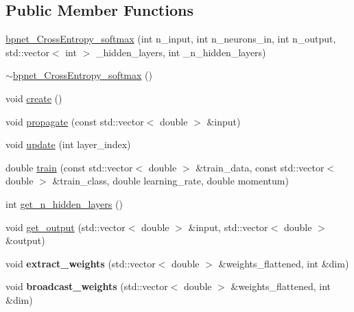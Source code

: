 \subsection*{Public Member Functions}
\begin{DoxyCompactItemize}
\item 
\hyperlink{classbpnet__CrossEntropy__softmax_af27dfc3aa73d018c4c5d9f27ae7057f1}{bpnet\-\_\-\-Cross\-Entropy\-\_\-softmax} (int n\-\_\-input, int n\-\_\-neurons\-\_\-in, int n\-\_\-output, std\-::vector$<$ int $>$ \-\_\-hidden\-\_\-layers, int \-\_\-n\-\_\-hidden\-\_\-layers)
\item 
\hyperlink{classbpnet__CrossEntropy__softmax_a369e61d402dde2a069fdc7cd7126c63e}{$\sim$bpnet\-\_\-\-Cross\-Entropy\-\_\-softmax} ()
\item 
void \hyperlink{classbpnet__CrossEntropy__softmax_a220ba65a1d29b86e4d200416d38c931d}{create} ()
\item 
void \hyperlink{classbpnet__CrossEntropy__softmax_a5bc91db68cdcb204fb1e46101cc731cd}{propagate} (const std\-::vector$<$ double $>$ \&input)
\item 
void \hyperlink{classbpnet__CrossEntropy__softmax_ab14df99bdcaa05a7b9c1a3b631a1662a}{update} (int layer\-\_\-index)
\item 
double \hyperlink{classbpnet__CrossEntropy__softmax_ad5945e5fb0ba6311a06833aa53023841}{train} (const std\-::vector$<$ double $>$ \&train\-\_\-data, const std\-::vector$<$ double $>$ \&train\-\_\-class, double learning\-\_\-rate, double momentum)
\item 
int \hyperlink{classbpnet__CrossEntropy__softmax_a9a4d4c77b996c83b0e881ae22868512b}{get\-\_\-n\-\_\-hidden\-\_\-layers} ()
\item 
void \hyperlink{classbpnet__CrossEntropy__softmax_aef5c2eb0db95b6bdca4cab71248f544c}{get\-\_\-output} (std\-::vector$<$ double $>$ \&input, std\-::vector$<$ double $>$ \&output)
\item 
\hypertarget{classbpnet__CrossEntropy__softmax_ad3a200f7c502382f466423dad4a13208}{void {\bfseries extract\-\_\-weights} (std\-::vector$<$ double $>$ \&weights\-\_\-flattened, int \&dim)}\label{classbpnet__CrossEntropy__softmax_ad3a200f7c502382f466423dad4a13208}

\item 
\hypertarget{classbpnet__CrossEntropy__softmax_abaef85b6740bc45675f06bfc3d6c3002}{void {\bfseries broadcast\-\_\-weights} (std\-::vector$<$ double $>$ \&weights\-\_\-flattened, int \&dim)}\label{classbpnet__CrossEntropy__softmax_abaef85b6740bc45675f06bfc3d6c3002}

\end{DoxyCompactItemize}

